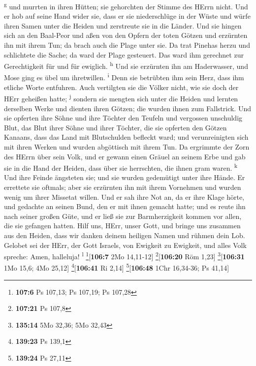 \textsuperscript{g}  und murrten in ihren Hütten; sie
gehorchten der Stimme des HErrn nicht.  Und er hob auf
seine Hand wider sie, dass er sie niederschlüge in der Wüste
 und würfe ihren Samen unter die Heiden und zerstreute
sie in die Länder.  Und sie hingen sich an den Baal-Peor
und aßen von den Opfern der toten Götzen  und erzürnten
ihn mit ihrem Tun; da brach auch die Plage unter sie.  Da
trat Pinehas herzu und schlichtete die Sache; da ward der Plage
gesteuert.  Das ward ihm gerechnet zur Gerechtigkeit für
und für ewiglich. \textsuperscript{h}  Und sie erzürnten
ihn am Haderwasser, und Mose ging es übel um ihretwillen.
\textsuperscript{i}  Denn sie betrübten ihm sein Herz,
dass ihm etliche Worte entfuhren.  Auch vertilgten sie
die Völker nicht, wie sie doch der HErr geheißen hatte;
\textsuperscript{j}  sondern sie mengten sich unter die
Heiden und lernten derselben Werke  und dienten ihren
Götzen; die wurden ihnen zum Fallstrick.  Und sie
opferten ihre Söhne und ihre Töchter den Teufeln  und
vergossen unschuldig Blut, das Blut ihrer Söhne und ihrer Töchter, die
sie opferten den Götzen Kanaans, dass das Land mit Blutschulden befleckt
ward;  und verunreinigten sich mit ihren Werken und
wurden abgöttisch mit ihrem Tun.  Da ergrimmte der Zorn
des HErrn über sein Volk, und er gewann einen Gräuel an seinem Erbe
 und gab sie in die Hand der Heiden, dass über sie
herrschten, die ihnen gram waren. \textsuperscript{k} 
Und ihre Feinde ängsteten sie; und sie wurden gedemütigt unter ihre
Hände.  Er errettete sie oftmals; aber sie erzürnten ihn
mit ihrem Vornehmen und wurden wenig um ihrer Missetat willen.
 Und er sah ihre Not an, da er ihre Klage hörte,
 und gedachte an seinen Bund, den er mit ihnen gemacht
hatte; und es reute ihn nach seiner großen Güte,  und er
ließ sie zur Barmherzigkeit kommen vor allen, die sie gefangen hatten.
 Hilf uns, HErr, unser Gott, und bringe uns zusammen aus
den Heiden, dass wir danken deinem heiligen Namen und rühmen dein Lob.
 Gelobet sei der HErr, der Gott Israels, von Ewigkeit zu
Ewigkeit, und alles Volk spreche: Amen, halleluja! \textsuperscript{l}
\footnote{\textbf{107:6} Ps 107,13; Ps 107,19; Ps 107,28}{[}\textbf{106:7}
2Mo 14,11-12{]} \footnote{\textbf{107:21} Ps 107,8}{[}\textbf{106:20}
Röm 1,23{]} \footnote{\textbf{135:14} 5Mo 32,36; 5Mo 32,43}{[}\textbf{106:31}
1Mo 15,6; 4Mo 25,12{]} \footnote{\textbf{139:23} Ps 139,1}{[}\textbf{106:41}
Ri 2,14{]} \footnote{\textbf{139:24} Ps 27,11}{[}\textbf{106:48} 1Chr
16,34-36; Ps 41,14{]}

